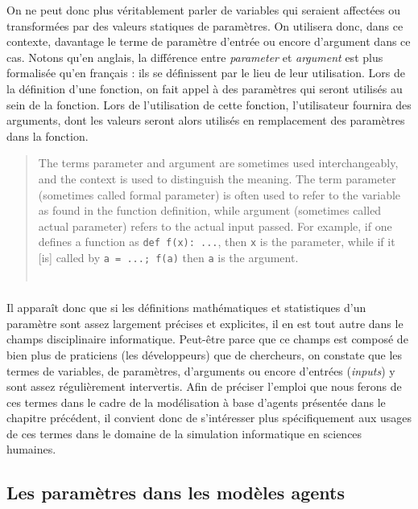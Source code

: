 \documentclass[12pt, a4paper, oneside]{book}
\begin{document}
	On ne peut donc plus véritablement parler de variables qui seraient affectées ou transformées par des valeurs statiques de paramètres. On utilisera donc, dans ce contexte, davantage le terme de paramètre d'entrée ou encore d'argument dans ce cas. Notons qu'en anglais, la différence entre \textit{parameter} et \textit{argument} est plus formalisée qu'en français : ils se définissent par le lieu de leur utilisation. Lors de la définition d'une fonction, on fait appel à des paramètres qui seront utilisés au sein de la fonction. Lors de l'utilisation de cette fonction, l'utilisateur fournira des arguments, dont les valeurs seront alors utilisés en remplacement des paramètres dans la fonction.
	\begin{quote}
			\og The terms parameter and argument are sometimes used interchangeably, and the context is used to distinguish the meaning. The term parameter (sometimes called formal parameter) is often used to refer to the variable as found in the function definition, while argument (sometimes called actual parameter) refers to the actual input passed. For example, if one defines a function as \texttt{def f(x): ...}, then \texttt{x} is the parameter, while if it [is] called by \texttt{a = ...; f(a)} then \texttt{a} is the argument.\fg{}\\
			\mbox{}~ \hfill \autocite{_parameter_2017} 
	\end{quote}


	\subsubsection*{} Il apparaît donc que si les définitions mathématiques et statistiques d'un paramètre sont assez largement précises et explicites, il en est tout autre dans le champs disciplinaire informatique. Peut-être parce que ce champs est composé de bien plus de praticiens (les développeurs) que de chercheurs, on constate que les termes de variables, de paramètres, d'arguments ou encore d'entrées (\textit{inputs}) y sont assez régulièrement intervertis. Afin de préciser l'emploi que nous ferons de ces termes dans le cadre de la modélisation à base d'agents présentée dans le chapitre précédent, il convient donc de s'intéresser plus spécifiquement aux usages de ces termes dans le domaine de la simulation informatique en sciences humaines.
	
	\subsection{Les paramètres dans les modèles agents}
	
\end{document}
